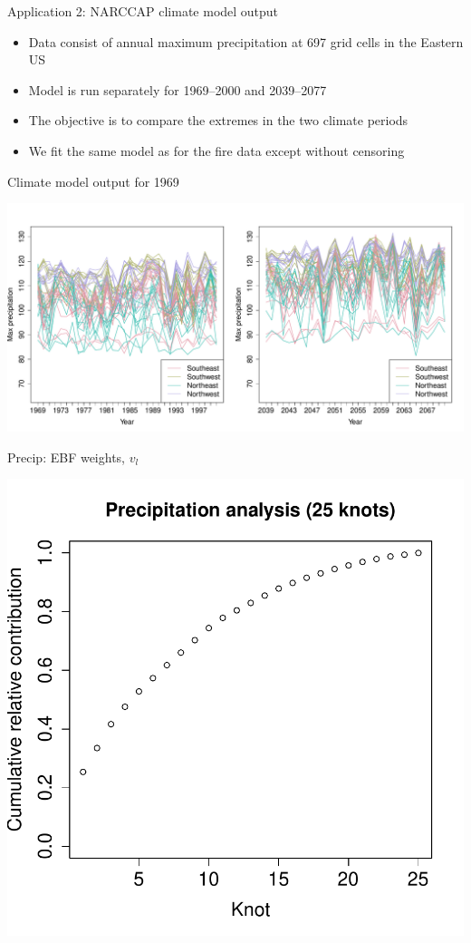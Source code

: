 \documentclass{beamer}
\begin{document}
\begin{frame}{Application 2: NARCCAP climate model output}
	\begin{itemize}\setlength{\itemsep}{1em}
		\item Data consist of annual maximum precipitation at 697 grid cells in the Eastern US
		\item Model is run separately for 1969--2000 and 2039--2077
		\item The objective is to compare the extremes in the two climate periods
		\item We fit the same model as for the fire data except without censoring
	\end{itemize}
\end{frame}


\begin{frame}{Climate model output for 1969}
	\begin{center}
		\includegraphics[width=\textwidth]{precip-ts}
	\end{center}
\end{frame}

\begin{frame}{Precip: EBF weights, $v_l$}
	\begin{center}
		\includegraphics[height=0.9\textheight]{precipv-25}
	\end{center}
\end{frame}
\end{document}
